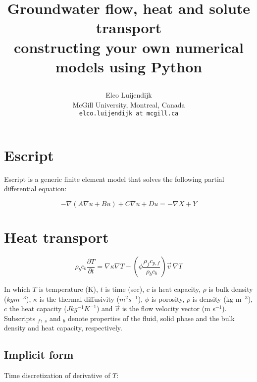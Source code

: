 \documentclass[11pt]{article}
\begin{document}
\title{\Large Groundwater flow, heat and solute transport\\
constructing your own numerical models using Python
\author{
\large Elco Luijendijk\\
\normalsize McGill University, Montreal, Canada\\
\texttt{elco.luijendijk at mcgill.ca}\\
}
\date{}
}

\maketitle


\section{Escript}

Escript is a generic finite element model that solves the following partial differential equation:

\begin{equation}
    - \nabla (A \nabla u + B u ) + C \nabla u + D u = - \nabla X + Y
\end{equation}


\pagebreak

\section{Heat transport}


\begin{equation}
	\rho _b c_b \frac{\partial{T}} {\partial{t}}=\nabla \kappa \nabla T - \left( \phi \frac{ \rho_{f} c_{p,f}} {\rho_{b} c_{b} } \right) \vec v \, \nabla T
	\label{eq:HFandAdvection}
\end{equation}

In which $T$ is temperature (K), $t$ is time (sec), $c$ is heat capacity, $\rho$ is bulk density (${kg} m^{-3}$), $\kappa$ is the thermal diffusivity ($m^2 s^{-1}$), $\phi$ is porosity, $\rho$ is density (kg m$^{-3}$), $c$ the heat capacity ($J kg^{-1} K^{-1}$) and $\vec v$ is the flow velocity vector (m s$^{-1}$). Subscripts $_f$, $_s$ and $_b$ denote properties of the fluid, solid phase and the bulk density and heat capacity, respectively.


\subsection{Implicit form}

Time discretization of derivative of $T$:
\end{document}
